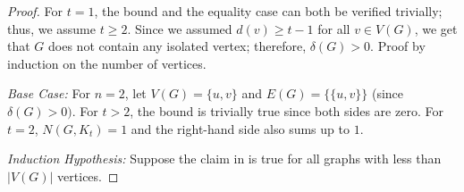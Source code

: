 \documentclass[pdflatex,sn-basic,Numbered]{sn-jnl}
\begin{document}
    \begin{proof}
        For $t=1$, the bound and the equality case can both be verified trivially; thus, we assume $t \geq 2$. Since we assumed $d(v) \geq t-1$ for all $v \in V(G)$, we get that $G$ does not contain any isolated vertex; therefore, $\delta(G) > 0$.
        \newline Proof by induction on the number of vertices.
        \vspace{2mm}

        \noindent \textit{Base Case:} For $n=2$, let $V(G)=\{u,v\}$ and $E(G) = \{\{u,v\}\}$ (since $\delta(G) >0)$. For $t>2$, the bound is trivially true since both sides are zero. For $t =2$, $N(G,K_t)=1$ and the right-hand side also sums up to $1$.
        \vspace{1mm}

        \noindent\textit{Induction Hypothesis:} Suppose the claim in  is true for all graphs with less than $|V(G)|$ vertices.
        \vspace{1mm}


\end{proof}
\end{document}
